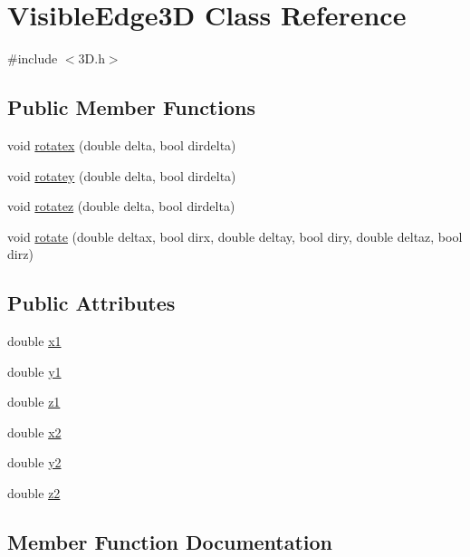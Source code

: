 \hypertarget{class_visible_edge3_d}{}\section{Visible\+Edge3D Class Reference}
\label{class_visible_edge3_d}


{\ttfamily \#include $<$3\+D.\+h$>$}

\subsection*{Public Member Functions}
\begin{DoxyCompactItemize}
\item 
void \hyperlink{class_visible_edge3_d_afa9b4085716f846b6e6a21ffd572c522}{rotatex} (double delta, bool dirdelta)
\item 
void \hyperlink{class_visible_edge3_d_aec765756edaedfcd8227971233aec323}{rotatey} (double delta, bool dirdelta)
\item 
void \hyperlink{class_visible_edge3_d_ac129da444218c582b4aa8bcca6471dfb}{rotatez} (double delta, bool dirdelta)
\item 
void \hyperlink{class_visible_edge3_d_a7bcac0265f689214f556701daff9423c}{rotate} (double deltax, bool dirx, double deltay, bool diry, double deltaz, bool dirz)
\end{DoxyCompactItemize}
\subsection*{Public Attributes}
\begin{DoxyCompactItemize}
\item 
double \hyperlink{class_visible_edge3_d_a5f8166834480fc4a44a717f9a0a3ee63}{x1}
\item 
double \hyperlink{class_visible_edge3_d_a96f5459cf496dfa36a58d87bf0aa2b7a}{y1}
\item 
double \hyperlink{class_visible_edge3_d_a0bcaa07147aa73ef6d0d7d3ab8ffcda9}{z1}
\item 
double \hyperlink{class_visible_edge3_d_a74b3003eaef4ed21f5d31f6b5af6c0cd}{x2}
\item 
double \hyperlink{class_visible_edge3_d_abe3cb984d99210979f5ebbd583a57487}{y2}
\item 
double \hyperlink{class_visible_edge3_d_acceabf9443fc361822b88ef461512fe3}{z2}
\end{DoxyCompactItemize}


\subsection{Member Function Documentation}
